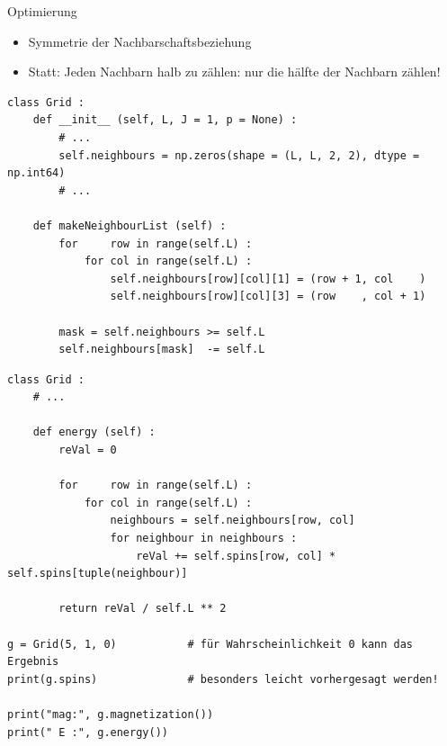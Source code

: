 
\begin{frame}[fragile]{Optimierung}
%
\begin{itemize}
\item Symmetrie der Nachbarschaftsbeziehung
\item Statt: Jeden Nachbarn halb zu zählen: nur die hälfte der Nachbarn zählen!
\end{itemize}
%
\begin{codebox}
\begin{verbatim}
class Grid :
    def __init__ (self, L, J = 1, p = None) :
        # ...
        self.neighbours = np.zeros(shape = (L, L, 2, 2), dtype = np.int64)
        # ...
    
    def makeNeighbourList (self) :
        for     row in range(self.L) :
            for col in range(self.L) :
                self.neighbours[row][col][1] = (row + 1, col    )
                self.neighbours[row][col][3] = (row    , col + 1)
                
        mask = self.neighbours >= self.L
        self.neighbours[mask]  -= self.L
\end{verbatim}
\end{codebox}
%
\end{frame}


\begin{frame}[fragile]
%
\begin{codebox}
\begin{verbatim}
class Grid :
    # ...
    
    def energy (self) :
        reVal = 0
        
        for     row in range(self.L) :
            for col in range(self.L) :
                neighbours = self.neighbours[row, col]
                for neighbour in neighbours :
                    reVal += self.spins[row, col] * self.spins[tuple(neighbour)]
        
        return reVal / self.L ** 2

g = Grid(5, 1, 0)           # für Wahrscheinlichkeit 0 kann das Ergebnis 
print(g.spins)              # besonders leicht vorhergesagt werden!

print("mag:", g.magnetization())
print(" E :", g.energy())
\end{verbatim}
\end{codebox}
%
\end{frame}

